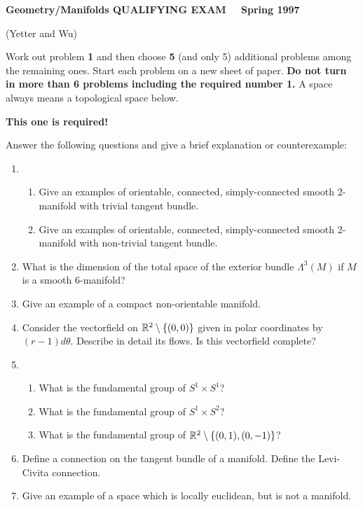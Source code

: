 \documentclass[12pt]{article}
\newcounter{problem}\setcounter{problem}{0}
\renewcommand{\theproblem}{\arabic{problem}}
\newcommand{\problem}{%
 	\par \vspace{1em} 
 	 \stepcounter{problem} 
 		\noindent {\bf {\theproblem}. }
 	}
\begin{document}
 \begin{center}

 {\bf Geometry/Manifolds QUALIFYING EXAM \ \ Spring 1997}

	(Yetter and Wu)
 \end{center}


Work out problem {\bf 1} and then choose {\bf 5} (and only 5) 
additional problems among the remaining ones. Start each 
problem on a new sheet of paper. 
{\bf Do not turn in more than 6 problems including the required number 1.}
A space always means a topological space below.

\vspace{20pt}
\bigskip \problem {\bf This one is required!}

Answer the following questions and give a brief explanation or
counterexample:
\begin{enumerate}
\item 	\begin{enumerate}
	\item Give an examples of orientable, connected, simply-connected
		smooth 2-manifold with trivial tangent bundle.
	\item Give an examples of orientable, connected, simply-connected
		smooth 2-manifold with non-trivial tangent bundle.
	\end{enumerate}
\item What is the dimension of the total space of the exterior bundle
	$\Lambda^3(M)$ if $M$ is a smooth $6$-manifold?
\item Give an example of a compact non-orientable manifold.
\item Consider the vectorfield on ${\Bbb R}^2\setminus \{ (0,0) \}$ given
	in polar coordinates by $(r-1)d\theta$.  Describe in detail its flows.
	Is this vectorfield complete?
\item \begin{enumerate}
	\item What is the fundamental group of $S^1 \times S^1$?
	\item What is the fundamental group of 
	$S^1 \times S^2$?
	\item What is the fundamental group of 
	${\Bbb R}^2 \setminus \{ (0, 1), (0, -1)\} $?
       \end{enumerate}
\item Define a connection on the tangent bundle of a manifold.  Define the
Levi-Civita connection.
\item Give an example of a space which is locally euclidean, but is not
a manifold.

\end{enumerate}
\end{document}
